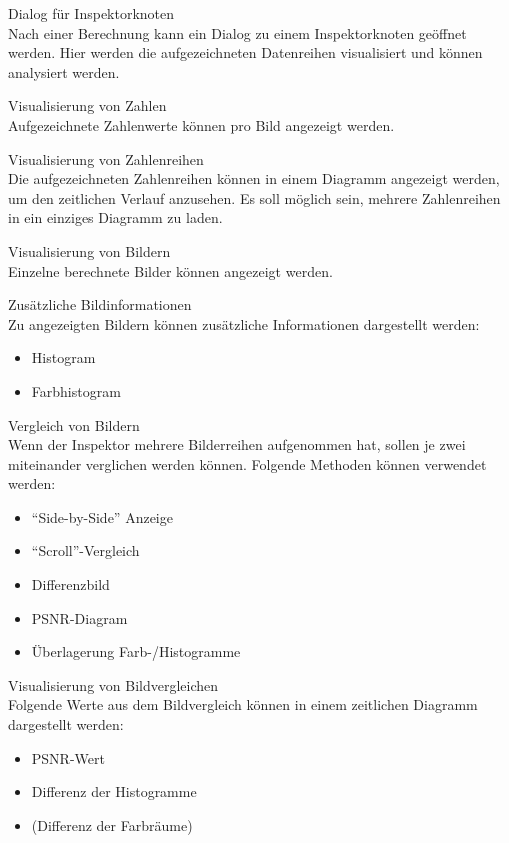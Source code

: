 \begin{speclist}[F]
\setcounter{specnum}{41010}

\spec Dialog für Inspektorknoten \\
Nach einer Berechnung kann ein Dialog zu einem Inspektorknoten geöffnet werden. Hier werden die aufgezeichneten Datenreihen visualisiert und können analysiert werden.

\spec Visualisierung von Zahlen \\
Aufgezeichnete Zahlenwerte können pro Bild angezeigt werden.

\spec Visualisierung von Zahlenreihen \\
Die aufgezeichneten Zahlenreihen können in einem Diagramm angezeigt werden, um den zeitlichen Verlauf anzusehen. Es soll möglich sein, mehrere Zahlenreihen in ein einziges Diagramm zu laden.

\spec Visualisierung von Bildern \\
Einzelne berechnete Bilder können angezeigt werden.

\spec Zusätzliche Bildinformationen \\
Zu angezeigten Bildern können zusätzliche Informationen dargestellt werden:
\begin{itemize}
	\item Histogram
	\item Farbhistogram
\end{itemize}

\spec Vergleich von Bildern \\
Wenn der Inspektor mehrere Bilderreihen aufgenommen hat, sollen je zwei miteinander verglichen werden können. Folgende Methoden können verwendet werden:
\begin{itemize}
	\item "`Side-by-Side"' Anzeige
	\item "`Scroll"'-Vergleich
	\item Differenzbild
	\item PSNR-Diagram
	\item Überlagerung Farb-/Histogramme
\end{itemize}

\spec Visualisierung von Bildvergleichen \\
Folgende Werte aus dem Bildvergleich können in einem zeitlichen Diagramm dargestellt werden:
\begin{itemize}
	\item PSNR-Wert
	\item Differenz der Histogramme
	\item (Differenz der Farbräume)
\end{itemize}


\end{speclist}
